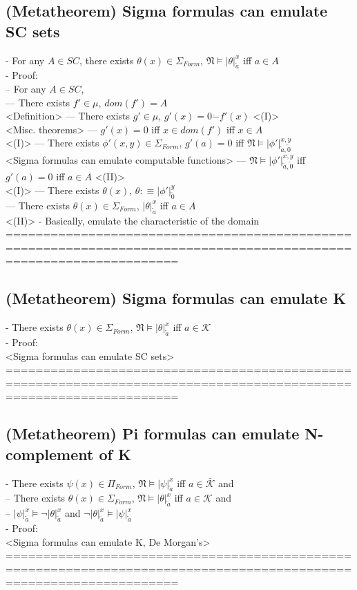 \documentclass{book}
\newcommand{\is}{:\equiv}
\newcommand{\sub}[3]{\left|#1\right|_{#3}^{#2}}
\begin{document}
\subsection{(Metatheorem) Sigma formulas can emulate SC sets} %
	- For any $A \in SC$, there exists $\theta(x) \in \Sigma_{Form}$, $\mathfrak{N} \vDash \sub{\theta}{x}{\overleftarrow{a}}$ iff $a \in A$ \\
	- Proof: \\
		-- For any $A \in SC$, \\
			--- There exists $f' \in \mu$, $dom(f') = A$ \\ <Definition>
			--- There exists $g' \in \mu$, $g'(x) = 0 \dot{-} f'(x)$ <(I)> \\ <Misc. theorems>
			--- $g'(x) = 0$ iff $x \in dom(f')$ iff $x \in A$ \\ <(I)>
			--- There exists $\phi'(x, y) \in \Sigma_{Form}$, $g'(a) = 0$ iff $\mathfrak{N} \vDash \sub{\phi'}{x, y}{\overleftarrow{a}, \overleftarrow{0}}$ \\ <Sigma formulas can emulate computable functions>
			--- $\mathfrak{N} \vDash \sub{\phi'}{x, y}{\overleftarrow{a}, \overleftarrow{0}}$ iff $g'(a) = 0$ iff $a \in A$ <(II)> \\ <(I)>
			--- There exists $\theta(x)$, $\theta \is \sub{\phi'}{y}{\overleftarrow{0}}$ \\
			--- There exists $\theta(x) \in \Sigma_{Form}$, $\sub{\theta}{x}{\overleftarrow{a}}$ iff $a \in A$ \\ <(II)>
	- Basically, emulate the characteristic of the domain \\
	===================================================================================================================
\subsection{(Metatheorem) Sigma formulas can emulate K} %
	- There exists $\theta(x) \in \Sigma_{Form}$, $\mathfrak{N} \vDash \sub{\theta}{x}{\overleftarrow{a}}$ iff $a \in \mathcal{K}$ \\
	- Proof: \\ <Sigma formulas can emulate SC sets>
	===================================================================================================================
\subsection{(Metatheorem) Pi formulas can emulate N-complement of K} %
	- There exists $\psi(x) \in \Pi_{Form}$, $\mathfrak{N} \vDash \sub{\psi}{x}{\overleftarrow{a}}$ iff $a \in \bar{\mathcal{K}}$ and \\
		-- There exists $\theta(x) \in \Sigma_{Form}$, $\mathfrak{N} \vDash \sub{\theta}{x}{\overleftarrow{a}}$ iff $a \in \mathcal{K}$ and \\
		-- $\sub{\psi}{x}{\overleftarrow{a}} \vDash \lnot \sub{\theta}{x}{\overleftarrow{a}}$ and $\lnot \sub{\theta}{x}{\overleftarrow{a}} \vDash \sub{\psi}{x}{\overleftarrow{a}}$ \\
	- Proof: \\ <Sigma formulas can emulate K, De Morgan's>
	===================================================================================================================
\end{document}
